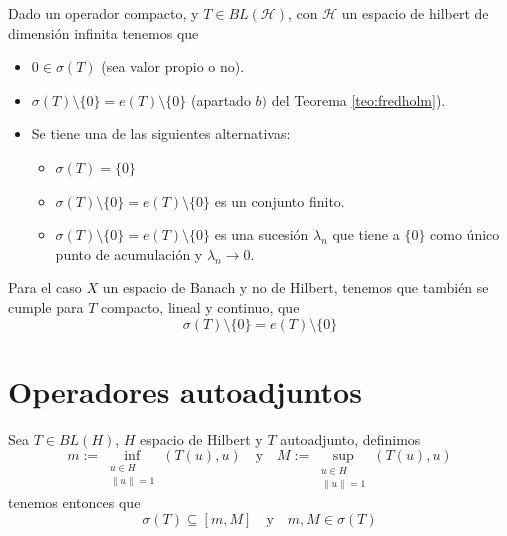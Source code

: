 \documentclass[12pt]{book}
\begin{document}
\begin{coro}
    Dado un operador
    compacto, y $T\in BL(\mathcal{H})$, con $\mathcal{H}$ un espacio de hilbert de dimensión infinita tenemos que 
    \begin{itemize}
        \item $0 \in \sigma(T)$ (sea valor propio o no).
        \item $\sigma(T) \setminus \{0\} = e(T) \setminus \{0\}$ (apartado $b)$ del Teorema \ref{teo:fredholm}).
        \item Se tiene una de las siguientes alternativas:
        \begin{itemize}
            \item $\sigma(T) = \{0\}$
            \item $\sigma(T) \setminus \{0\} = e(T) \setminus \{0\}$ es un conjunto finito.
            \item $\sigma(T) \setminus \{0\} = e(T) \setminus \{0\}$ es una sucesión $\lambda_n$ que tiene a $\{0\}$ como único punto de acumulación y $\lambda_n \to 0$.
        \end{itemize}
    \end{itemize}
\end{coro}
\begin{observacion}
    Para el caso $X$ un espacio de Banach y no de Hilbert, tenemos que también se cumple para $T$ compacto, lineal y continuo, que
    \begin{equation*}
        \sigma(T) \setminus \{0\} = e(T) \setminus \{0\}
    \end{equation*}
\end{observacion}

\section{Operadores autoadjuntos}
\begin{teo}
    Sea $T \in BL(H)$, $H$ espacio de Hilbert  y $T$ autoadjunto, definimos
    \begin{equation*}
        m := \inf_{\substack{u \in H \\ \|u\|=1}} (T(u), u ) \quad \text{y} \quad M := \sup_{\substack{u \in H \\ \|u\|=1}} ( T(u), u )
    \end{equation*}
    tenemos entonces que 
    \begin{equation*}
        \sigma(T) \subseteq [m, M] \quad \text{y} \quad m, M \in \sigma(T)
    \end{equation*}
\end{teo}
\end{document}
